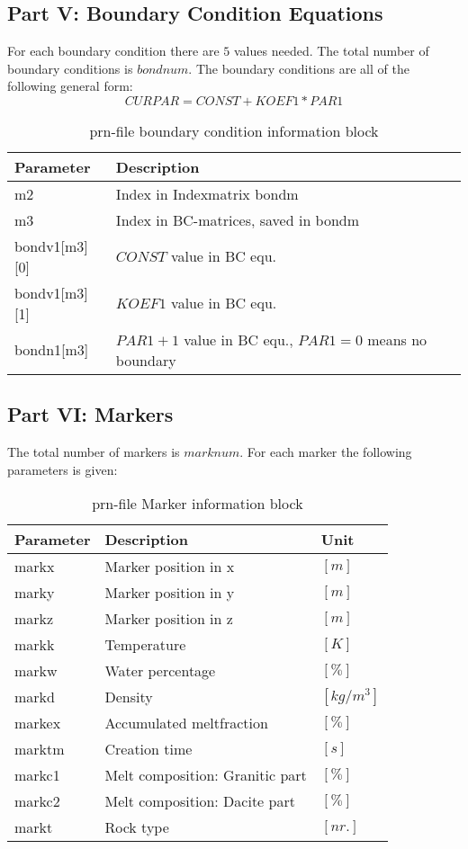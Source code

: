 \subsection{Part V: Boundary Condition Equations}

For each boundary condition there are $5$ values needed. The total number of boundary conditions is $bondnum$. The boundary conditions are all of the following general form:
$$CURPAR = CONST + KOEF1*PAR1$$

\begin{table}[H]
\small
\centering
\begin{tabular}{l p{9cm}}
\toprule
Parameter & Description\\
\midrule
m2 & Index in Indexmatrix bondm\\ 
m3 & Index in BC-matrices, saved in bondm \\ 
bondv1[m3][0] &  $CONST$ value in BC equ. \\ 
bondv1[m3][1] &  $KOEF1$ value in BC equ. \\ 
bondn1[m3] & $PAR1+1$ value in BC equ., $PAR1=0$ means no boundary \\ 
\bottomrule
\end{tabular}
\caption{prn-file boundary condition information block}
\label{tbl:prn_bond_info}
\end{table}

\subsection{Part VI: Markers}

The total number of markers is $marknum$. For each marker the following parameters is given:

\begin{table}[H]
\small
\centering
\begin{tabular}{l p{8cm} l}
\toprule
Parameter & Description & Unit\\
\midrule
markx & Marker position in x & $[m]$\\ 
marky & Marker position in y & $[m]$\\ 
markz & Marker position in z & $[m]$\\ 
markk & Temperature & $[K]$\\ 
markw & Water percentage & $[\%]$\\ 
markd & Density & $[kg/m^3]$\\ 
markex & Accumulated meltfraction & $[\%]$\\ 
marktm & Creation time & $[s]$\\ 
markc1 & Melt composition: Granitic part & $[\%]$\\ 
markc2 & Melt composition: Dacite part & $[\%]$\\
markt  & Rock type & $[nr.]$\\
\bottomrule
\end{tabular}
\caption{prn-file Marker information block}
\label{tbl:prn_marker_info}
\end{table}